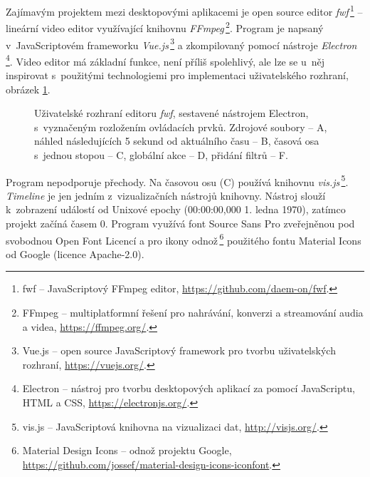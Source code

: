 Zajímavým projektem mezi desktopovými aplikacemi je open source editor \textit{fwf}\,\footnote{fwf -- JavaScriptový FFmpeg editor, \url{https://github.com/daem-on/fwf}.} -- lineární video editor využívající knihovnu \textit{FFmpeg}\,\footnote{FFmpeg -- multiplatformní řešení pro nahrávání, konverzi a streamování audia a videa, \url{https://ffmpeg.org/}.}. Program je napsaný v~JavaScriptovém frameworku \textit{Vue.js}\,\footnote{Vue.js -- open source JavaScriptový framework pro tvorbu uživatelských rozhraní, \url{https://vuejs.org/}.} a zkompilovaný pomocí nástroje \textit{Electron}\,\footnote{Electron -- nástroj pro tvorbu desktopových aplikací za pomocí JavaScriptu, HTML a CSS, \url{https://electronjs.org/}.}. Video editor má základní funkce, není příliš spolehlivý, ale lze se u~něj inspirovat s~použitými technologiemi pro implementaci uživatelského rozhraní, obrázek \ref{img:fwf}.
\begin{figure}[h]
	\centering
	\caption{Uživatelské rozhraní editoru \textit{fwf}, sestavené nástrojem Electron, s~vyznačeným rozložením ovládacích prvků. Zdrojové soubory -- A, náhled následujících 5 sekund od aktuálního času -- B, časová osa s~jednou stopou -- C, globální akce -- D, přidání filtrů -- F.}\label{img:fwf}
\end{figure}
Program nepodporuje přechody. Na časovou osu (C) používá knihovnu \textit{vis.js}\,\footnote{vis.js -- JavaScriptová knihovna na vizualizaci dat, \url{http://visjs.org/}.}. \textit{Timeline} je jen jedním z~vizualizačních nástrojů knihovny. Nástroj slouží k~zobrazení událostí od Unixové epochy (00:00:00,000 1. ledna 1970), zatímco projekt začíná časem 0. Program využívá font Source Sans Pro zveřejněnou pod svobodnou Open Font Licencí a pro ikony odnož\,\footnote{Material Design Icons -- odnož projektu Google, \url{https://github.com/jossef/material-design-icons-iconfont}.} použitého fontu Material Icons od Google (licence Apache-2.0).

